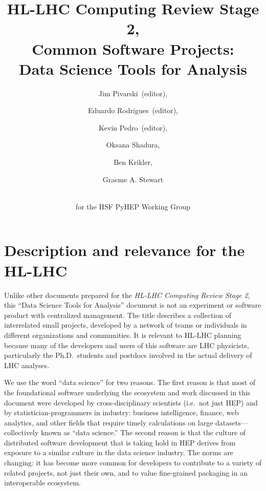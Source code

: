 \documentclass[12pt,a4paper]{article}
\begin{document}
\title{HL-LHC Computing Review Stage 2, \\ Common Software Projects:\\
Data Science Tools for Analysis}
\author[1]{Jim Pivarski~(editor),}
\author[2]{Eduardo Rodrigues~(editor),}
\author[3]{Kevin Pedro~(editor),}
\author[4]{Oksana Shadura,}
\author[5]{Ben Krikler,}
\author[6]{Graeme A. Stewart}
\author{\\for the HSF PyHEP Working Group}


\maketitle

\section{Description and relevance for the HL-LHC}

Unlike other documents prepared for the \textit{HL-LHC Computing Review Stage 2}, this ``Data Science Tools for Analysis'' document is not an experiment or software product with centralized management. The title describes a collection of interrelated small projects, developed by a network of teams or individuals in different organizations and communities. It is relevant to HL-LHC planning because many of the developers and users of this software are LHC physicists, particularly the Ph.D.\ students and postdocs involved in the actual delivery of LHC analyses.

We use the word ``data science'' for two reasons. The first reason is that most of the foundational software underlying the ecosystem and work discussed in this document were developed by cross-disciplinary scientists (i.e.\ not just HEP) and by statistician-programmers in industry: business intelligence, finance, web analytics, and other fields that require timely calculations on large datasets---collectively known as ``data science.'' The second reason is that the culture of distributed software development that is taking hold in HEP derives from exposure to a similar culture in the data science industry. The norms are changing: it has become more common for developers to contribute to a variety of related projects, not just their own, and to value fine-grained packaging in an interoperable ecosystem.
\end{document}
